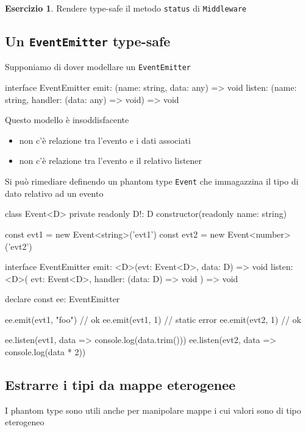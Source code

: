 \documentclass[12pt]{article}
\theoremstyle{definition}
\newtheorem{exercise}{Esercizio}[subsection]
\newenvironment{code}
  {\vspace{0.5cm} \VerbatimEnvironment\begin{typescriptcode}}
  {\end{typescriptcode} \vspace{0.2cm}}
\begin{document}
\begin{exercise}
Rendere type-safe il metodo \texttt{status} di \texttt{Middleware}
\end{exercise}

\subsection{Un \texttt{EventEmitter} type-safe}

Supponiamo di dover modellare un \texttt{EventEmitter}

\begin{code}
interface EventEmitter {
  emit: (name: string, data: any) => void
  listen: (name: string, handler: (data: any) => void) => void
}
\end{code}

Questo modello è insoddisfacente

\begin{itemize}
  \item non c'è relazione tra l'evento e i dati associati
  \item non c'è relazione tra l'evento e il relativo listener
\end{itemize}

Si può rimediare definendo un phantom type \texttt{Event} che immagazzina il tipo di dato relativo ad un evento

\begin{code}
class Event<D> {
  private readonly D!: D
  constructor(readonly name: string) {}
}

const evt1 = new Event<string>('evt1')
const evt2 = new Event<number>('evt2')

interface EventEmitter {
  emit: <D>(evt: Event<D>, data: D) => void
  listen: <D>(
    evt: Event<D>,
    handler: (data: D) => void
  ) => void
}

declare const ee: EventEmitter

ee.emit(evt1, "foo") // ok
ee.emit(evt1, 1) // static error
ee.emit(evt2, 1) // ok

ee.listen(evt1, data => console.log(data.trim()))
ee.listen(evt2, data => console.log(data * 2))
\end{code}

\subsection{Estrarre i tipi da mappe eterogenee}

I phantom type sono utili anche per manipolare mappe i cui valori sono di tipo eterogeneo
\end{document}
